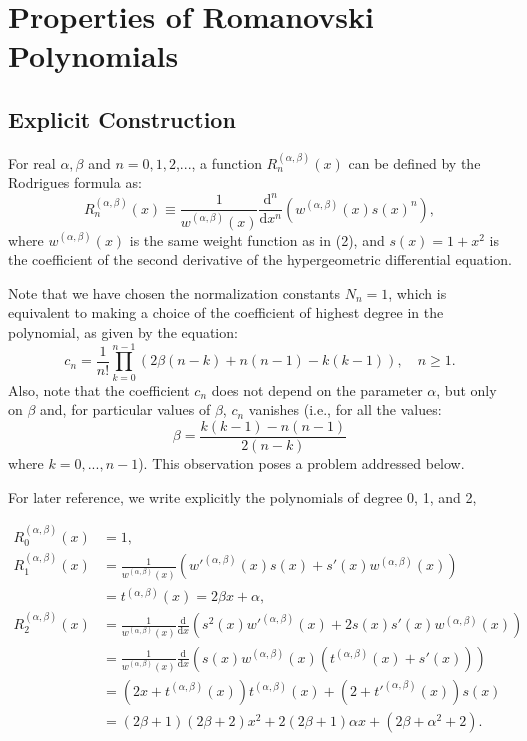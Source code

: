 \documentclass{article}
\begin{document}
\section*{Properties of Romanovski Polynomials}

\subsection*{Explicit Construction}

For real $\alpha, \beta$ and $n = 0, 1, 2$,..., a function $R^{(\alpha,
\beta)}_n (x)$ can be defined by the Rodrigues formula as:
\begin{equation}
  R_n^{(\alpha, \beta)} (x) \equiv \frac{1}{w^{(\alpha, \beta)} (x)} 
  \frac{\mathrm{d}^n}{\mathrm{d} x^n}  (w^{(\alpha, \beta)} (x) s (x)^n),
\end{equation}
where $w^{(\alpha, \beta)} (x)$ is the same weight function as in (2), and $s
(x) = 1 + x^2$ is the coefficient of the second derivative of the
hypergeometric differential equation.

Note that we have chosen the normalization constants $N_n = 1$, which is
equivalent to making a choice of the coefficient of highest degree in the
polynomial, as given by the equation:
\begin{equation}
  c_n = \frac{1}{n!}  \prod_{k = 0}^{n - 1} (2 \beta (n - k) + n (n - 1) - k
  (k - 1)), \quad n \geq 1.
\end{equation}
Also, note that the coefficient $c_n$ does not depend on the parameter
$\alpha$, but only on $\beta$ and, for particular values of $\beta$, $c_n$
vanishes (i.e., for all the values:
\[ \beta = \frac{k (k - 1) - n (n - 1)}{2 (n - k)} \]
where $k = 0, ..., n - 1$). This observation poses a problem addressed below.

For later reference, we write explicitly the polynomials of degree 0, 1, and
2,

\begin{align*}
  R_0^{(\alpha, \beta)} (x) & = 1,\\
  R^{(\alpha, \beta)}_1 (x) & = \frac{1}{w^{(\alpha, \beta)} (x)}  \left(
  {w'}^{(\alpha, \beta)} (x) s (x) + s' (x) w^{(\alpha, \beta)} (x) \right)\\
  & = t^{(\alpha, \beta)} (x) = 2 \beta x + \alpha,\\
  R^{(\alpha, \beta)}_2 (x) & = \frac{1}{w^{(\alpha, \beta)} (x)} 
  \frac{\mathrm{d}}{\mathrm{d} x}  \left( s^2 {(x) w'}^{(\alpha, \beta)} (x) +
  2 s (x) s' (x) w^{(\alpha, \beta)} (x) \right)\\
  & = \frac{1}{w^{(\alpha, \beta)} (x)}  \frac{\mathrm{d}}{\mathrm{d} x}  (s
  (x) w^{(\alpha, \beta)} (x) (t^{(\alpha, \beta)} (x) + s' (x)))\\
  & = (2 x + t^{(\alpha, \beta)} (x)) t^{(\alpha, \beta)} (x) + \left( {2 +
  t'}^{(\alpha, \beta)} (x) \right) s (x)\\
  & = (2 \beta + 1)  (2 \beta + 2) x^2 + 2 (2 \beta + 1) \alpha x + (2 \beta
  + \alpha^2 + 2) .
\end{align*}
\end{document}
